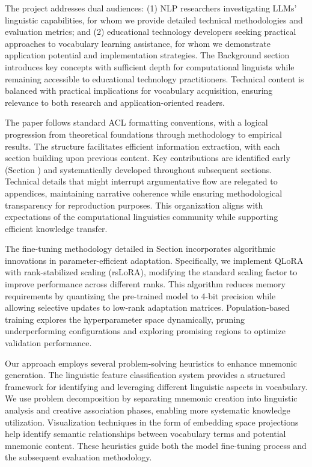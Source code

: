  The project addresses dual audiences: (1) NLP researchers investigating LLMs' linguistic capabilities, for whom we provide detailed technical methodologies and evaluation metrics; and (2) educational technology developers seeking practical approaches to vocabulary learning assistance, for whom we demonstrate application potential and implementation strategies. The Background section introduces key concepts with sufficient depth for computational linguists while remaining accessible to educational technology practitioners. Technical content is balanced with practical implications for vocabulary acquisition, ensuring relevance to both research and application-oriented readers.

 The paper follows standard ACL formatting conventions, with a logical progression from theoretical foundations through methodology to empirical results. The structure facilitates efficient information extraction, with each section building upon previous content. Key contributions are identified early (Section ) and systematically developed throughout subsequent sections. Technical details that might interrupt argumentative flow are relegated to appendices, maintaining narrative coherence while ensuring methodological transparency for reproduction purposes. This organization aligns with expectations of the computational linguistics community while supporting efficient knowledge transfer.

 The fine-tuning methodology detailed in Section  incorporates algorithmic innovations in parameter-efficient adaptation. Specifically, we implement QLoRA with rank-stabilized scaling (rsLoRA), modifying the standard scaling factor to improve performance across different ranks. This algorithm reduces memory requirements by quantizing the pre-trained model to 4-bit precision while allowing selective updates to low-rank adaptation matrices. Population-based training explores the hyperparameter space dynamically, pruning underperforming configurations and exploring promising regions to optimize validation performance.

 Our approach employs several problem-solving heuristics to enhance mnemonic generation. The linguistic feature classification system provides a structured framework for identifying and leveraging different linguistic aspects in vocabulary. We use problem decomposition by separating mnemonic creation into linguistic analysis and creative association phases, enabling more systematic knowledge utilization. Visualization techniques in the form of embedding space projections help identify semantic relationships between vocabulary terms and potential mnemonic content. These heuristics guide both the model fine-tuning process and the subsequent evaluation methodology.

